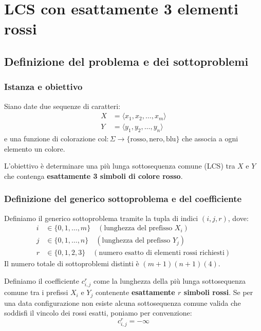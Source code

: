 \chapter{LCS con esattamente 3 elementi rossi}

\section{Definizione del problema e dei sottoproblemi}

\subsection{Istanza e obiettivo}
Siano date due sequenze di caratteri:
\begin{align*}
    X &= \langle x_1, x_2, \dots, x_m \rangle \\
    Y &= \langle y_1, y_2, \dots, y_n \rangle
\end{align*}
e una funzione di colorazione $\text{col}: \Sigma \to \{\text{rosso}, \text{nero}, \text{blu}\}$ che associa a ogni elemento un colore.

L'obiettivo è determinare una più lunga sottosequenza comune (LCS) tra $X$ e $Y$ che contenga \textbf{esattamente 3 simboli di colore rosso}.

\subsection{Definizione del generico sottoproblema e del coefficiente}
Definiamo il generico sottoproblema tramite la tupla di indici $(i, j, r)$, dove:
\begin{align*}
    i &\in \{0, 1, \dots, m\} \quad (\text{lunghezza del prefisso } X_i) \\
    j &\in \{0, 1, \dots, n\} \quad (\text{lunghezza del prefisso } Y_j) \\
    r &\in \{0, 1, 2, 3\} \quad (\text{numero esatto di elementi rossi richiesti})
\end{align*}
Il numero totale di sottoproblemi distinti è $(m + 1)(n + 1)(4)$.

Definiamo il coefficiente $c_{i,j}^r$ come la lunghezza della più lunga sottosequenza comune tra i prefissi $X_i$ e $Y_j$ contenente \textbf{esattamente $r$ simboli rossi}. Se per una data configurazione non esiste alcuna sottosequenza comune valida che soddisfi il vincolo dei rossi esatti, poniamo per convenzione:
\begin{equation*}
    c_{i,j}^r = -\infty
\end{equation*}


